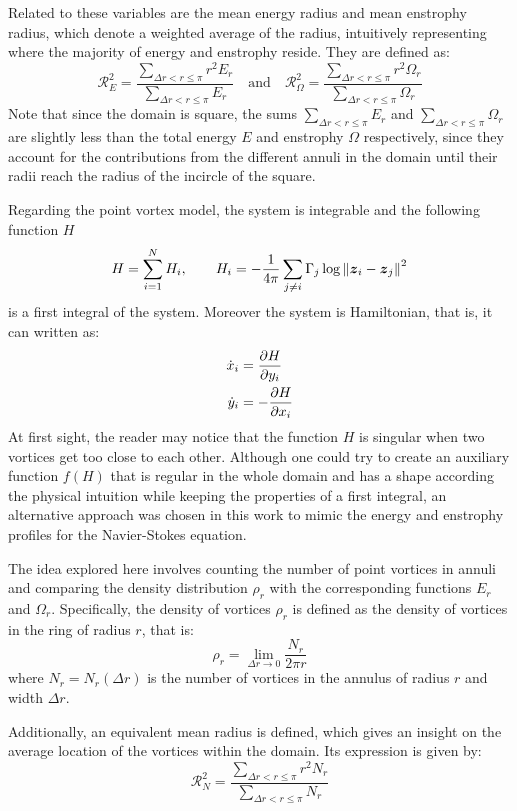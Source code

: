 \documentclass[../main.tex]{subfiles}
\begin{document}
Related to these variables are the mean energy radius and mean enstrophy radius, which denote a weighted average of the radius, intuitively representing where the majority of energy and enstrophy reside. They are defined as:
\begin{equation}
	\mathcal{R}_E^2      = \frac{\sum_{\Delta r<r\leq \pi} r^2 E_r}{\sum_{\Delta r<r\leq \pi} E_r}\quad \text{and}  \quad
	\mathcal{R}_\Omega^2 = \frac{\sum_{\Delta r<r\leq \pi} r^2 \Omega_r}{\sum_{\Delta r<r\leq \pi} \Omega_r}
\end{equation}
Note that since the domain is square, the sums $\sum_{\Delta r<r\leq \pi}  E_r$ and $\sum_{\Delta r<r\leq \pi}  \Omega_r$ are slightly less than the total energy $E$ and enstrophy $\Omega$ respectively, since they account for the contributions from the different annuli in the domain until their radii reach the radius of the incircle of the square.

Regarding the point vortex model, the system is integrable and the following function $H$
\begin{equation}
	H = \sum_{i=1}^{N} H_i,\qquad H_i = -\frac{1}{4\pi} \sum_{j\neq i} \Gamma_j \log{\left\|\boldsymbol{z}_i-\boldsymbol{z}_j\right\|^2}
\end{equation}
is a first integral of the system. Moreover the system is Hamiltonian, that is, it can written as:
\begin{align}
	\dot{x}_i & = \pdv{H}{y_i}  \\
	\dot{y}_i & = -\pdv{H}{x_i}
\end{align}
At first sight, the reader may notice that the function $H$ is singular when two vortices get too close to each other. Although one could try to create an auxiliary function $f(H)$ that is regular in the whole domain and has a shape according the physical intuition while keeping the properties of a first integral, an alternative approach was chosen in this work to mimic the energy and enstrophy profiles for the Navier-Stokes equation.

The idea explored here involves counting the number of point vortices in annuli and comparing the density distribution $\rho_r$ with the corresponding functions $E_r$ and $\Omega_r$. Specifically, the density of vortices $\rho_r$ is defined as the density of vortices in the ring of radius $r$, that is:
\begin{equation}
	\rho_r = \lim_{\Delta r \to 0} \frac{N_r}{2 \pi r}
\end{equation}
where $N_r=N_r(\Delta r)$ is the number of vortices in the annulus of radius $r$ and width $\Delta r$.

Additionally, an equivalent mean radius is defined, which gives an insight on the average location of the vortices within the domain. Its expression is given by:
\begin{equation}\label{eq:meanradius_vortices}
	\mathcal{R}_N^2 = \frac{\sum_{\Delta r<r\leq \pi} r^2 N_r}{\sum_{\Delta r<r\leq \pi} N_r}
\end{equation}
\end{document}
